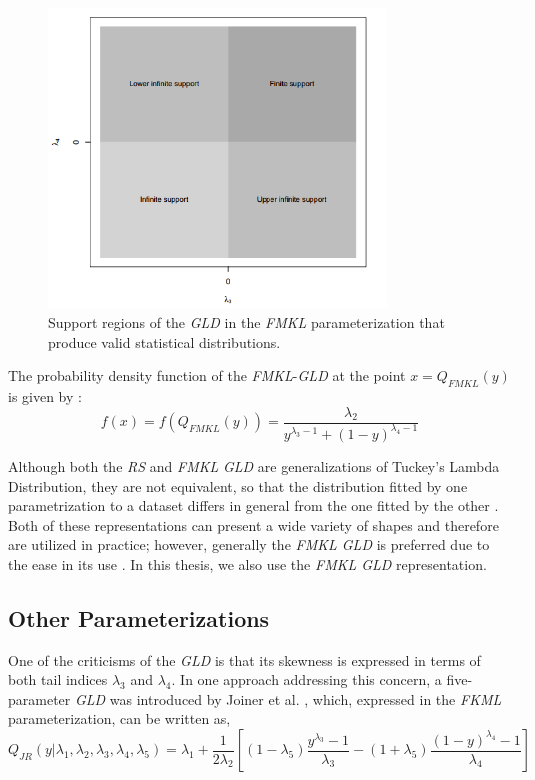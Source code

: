 \begin{figure}[ht]
    \centering
    \includegraphics[width=0.8\textwidth]{img/gld/fmkl_regions.png}
    \caption{Support regions of the \textit{GLD} in the \textit{FMKL} parameterization that produce valid statistical
distributions.}
    \label{fig:fmkl_regions}
\end{figure}

The probability density function of the \textit{FMKL}-\textit{GLD} at the point $x=Q_{FMKL}(y)$ is given by \cite{Su2015}:
\begin{equation}\label{eq:fmkl_pdf}
f(x)=f(Q_{FMKL}(y))=\frac{\lambda_{2}}{y^{\lambda_{3}-1}+(1-y)^{\lambda_{4}-1}}
\end{equation}

Although both the \textit{RS} and \textit{FMKL} \textit{GLD} are generalizations of Tuckey's Lambda Distribution, they are not equivalent, so that the distribution fitted by one parametrization to a dataset differs in general from the one fitted by the other \cite{Marcondes2018}. Both of these representations can present a wide variety of shapes and therefore are utilized in practice; however, generally the \textit{FMKL GLD} is preferred due to the ease in its use \cite{Corlu2016}. In this thesis, we also use the \textit{FMKL GLD} representation.

\subsection{Other Parameterizations}\label{sec:gld_other_param}
One of the criticisms of the \textit{GLD} is that its skewness is expressed in terms of both tail indices $\lambda_{3}$ and $\lambda_{4}$. In one approach addressing this concern, a five-parameter \textit{GLD} was introduced by Joiner et al. \cite{Joiner1971}, which, expressed in the \textit{FKML} parameterization, can be written as,
\begin{equation}\label{eq:jr_param}
Q_{JR}(y|\lambda_{1}, \lambda_{2}, \lambda_{3}, \lambda_{4}, \lambda_{5})=\lambda_{1}+\frac{1}{2 \lambda_{2}}\left[(1-\lambda_{5})\frac{y^{\lambda_{3}}-1}{\lambda_{3}} - (1+\lambda_{5})\frac{(1-y)^{\lambda_{4}}-1}{\lambda_{4}} \right] 
\end{equation}

